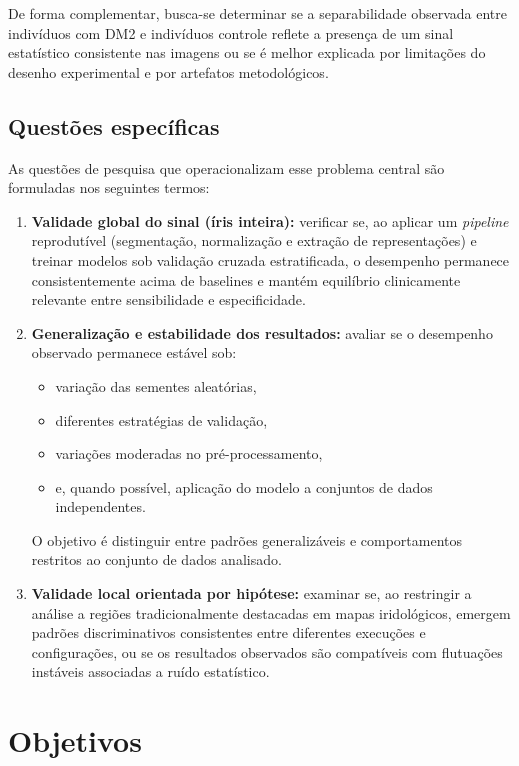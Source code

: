 \documentclass[12pt,a4paper]{article}
\begin{document}
De forma complementar, busca-se determinar se a separabilidade observada entre indivíduos com DM2 e indivíduos controle reflete a presença de um sinal estatístico consistente nas imagens ou se é melhor explicada por limitações do desenho experimental e por artefatos metodológicos.

\subsection{Questões específicas}
As questões de pesquisa que operacionalizam esse problema central são formuladas nos seguintes termos:

\begin{enumerate}
    \item \textbf{Validade global do sinal (íris inteira):} verificar se, ao aplicar um \textit{pipeline} reprodutível (segmentação, normalização e extração de representações) e treinar modelos sob validação cruzada estratificada, o desempenho permanece consistentemente acima de baselines e mantém equilíbrio clinicamente relevante entre sensibilidade e especificidade.

    \item \textbf{Generalização e estabilidade dos resultados:} avaliar se o desempenho observado permanece estável sob:
    \begin{itemize}
        \item variação das sementes aleatórias,
        \item diferentes estratégias de validação,
        \item variações moderadas no pré-processamento,
        \item e, quando possível, aplicação do modelo a conjuntos de dados independentes.
    \end{itemize}
    O objetivo é distinguir entre padrões generalizáveis e comportamentos restritos ao conjunto de dados analisado.

    \item \textbf{Validade local orientada por hipótese:} examinar se, ao restringir a análise a regiões tradicionalmente destacadas em mapas iridológicos, emergem padrões discriminativos consistentes entre diferentes execuções e configurações, ou se os resultados observados são compatíveis com flutuações instáveis associadas a ruído estatístico.
\end{enumerate}

\section{Objetivos}
\end{document}
